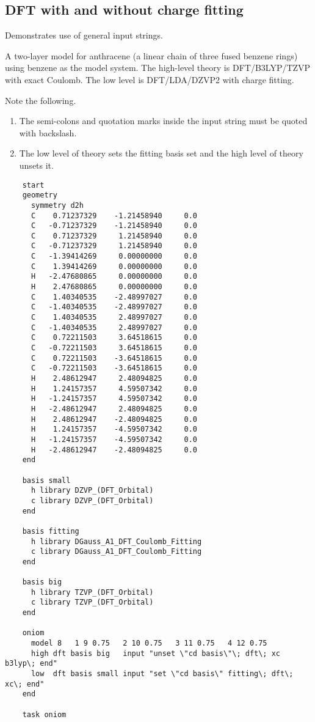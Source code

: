\subsection{DFT with and without charge fitting}
\label{sec:oniomeg4}
Demonstrates use of general input strings.

A two-layer model for anthracene (a linear chain of three fused benzene
rings) using benzene as the model system.  The high-level theory is
DFT/B3LYP/TZVP with exact Coulomb. The low level is DFT/LDA/DZVP2 with
charge fitting.  

Note the following.  
\begin{enumerate}
\item The semi-colons and quotation marks inside the input string must be 
quoted with backslash.
\item The low level of theory sets the fitting basis set and the high level of 
theory unsets it.
\end{enumerate}

\begin{verbatim}
    start
    geometry 
      symmetry d2h
      C    0.71237329    -1.21458940     0.0
      C   -0.71237329    -1.21458940     0.0
      C    0.71237329     1.21458940     0.0
      C   -0.71237329     1.21458940     0.0
      C   -1.39414269     0.00000000     0.0
      C    1.39414269     0.00000000     0.0
      H   -2.47680865     0.00000000     0.0
      H    2.47680865     0.00000000     0.0
      C    1.40340535    -2.48997027     0.0
      C   -1.40340535    -2.48997027     0.0
      C    1.40340535     2.48997027     0.0
      C   -1.40340535     2.48997027     0.0
      C    0.72211503     3.64518615     0.0
      C   -0.72211503     3.64518615     0.0
      C    0.72211503    -3.64518615     0.0
      C   -0.72211503    -3.64518615     0.0
      H    2.48612947     2.48094825     0.0
      H    1.24157357     4.59507342     0.0
      H   -1.24157357     4.59507342     0.0
      H   -2.48612947     2.48094825     0.0
      H    2.48612947    -2.48094825     0.0
      H    1.24157357    -4.59507342     0.0
      H   -1.24157357    -4.59507342     0.0
      H   -2.48612947    -2.48094825     0.0
    end

    basis small
      h library DZVP_(DFT_Orbital)
      c library DZVP_(DFT_Orbital)
    end

    basis fitting
      h library DGauss_A1_DFT_Coulomb_Fitting
      c library DGauss_A1_DFT_Coulomb_Fitting
    end

    basis big
      h library TZVP_(DFT_Orbital)
      c library TZVP_(DFT_Orbital)
    end

    oniom
      model 8   1 9 0.75   2 10 0.75   3 11 0.75   4 12 0.75
      high dft basis big   input "unset \"cd basis\"\; dft\; xc b3lyp\; end"
      low  dft basis small input "set \"cd basis\" fitting\; dft\; xc\; end"
    end

    task oniom
\end{verbatim}
